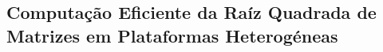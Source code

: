 \documentclass[../thesis]{subfiles}
\begin{document}
	\chapter*{\abstractname}
		\section*{Computação Eficiente da Raíz Quadrada de Matrizes em Plataformas Heterogéneas}
\end{document}
